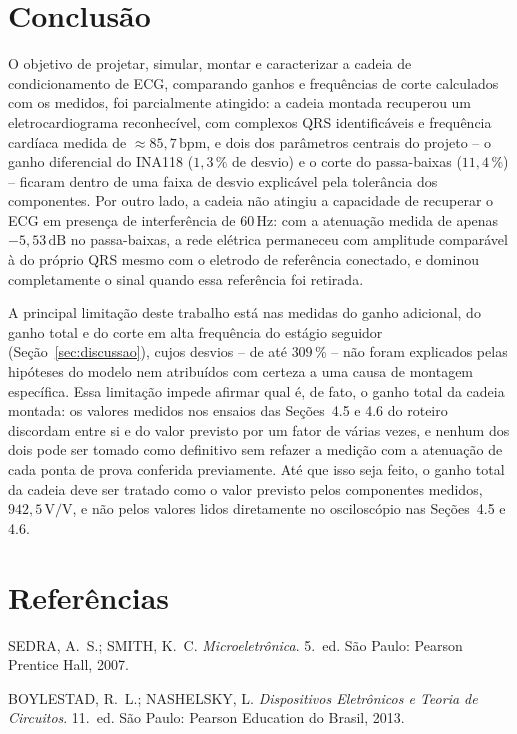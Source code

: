 \documentclass[11pt,a4paper]{article}
\begin{document}
\section{Conclusão}

O objetivo de projetar, simular, montar e caracterizar a cadeia de condicionamento de ECG, comparando ganhos e frequências de corte calculados com os medidos, foi parcialmente atingido: a cadeia montada recuperou um eletrocardiograma reconhecível, com complexos QRS identificáveis e frequência cardíaca medida de \(\approx85{,}7\,\text{bpm}\), e dois dos parâmetros centrais do projeto -- o ganho diferencial do INA118 (\(1{,}3\,\%\) de desvio) e o corte do passa-baixas (\(11{,}4\,\%\)) -- ficaram dentro de uma faixa de desvio explicável pela tolerância dos componentes. Por outro lado, a cadeia não atingiu a capacidade de recuperar o ECG em presença de interferência de \(60\,\text{Hz}\): com a atenuação medida de apenas \(-5{,}53\,\text{dB}\) no passa-baixas, a rede elétrica permaneceu com amplitude comparável à do próprio QRS mesmo com o eletrodo de referência conectado, e dominou completamente o sinal quando essa referência foi retirada.

A principal limitação deste trabalho está nas medidas do ganho adicional, do ganho total e do corte em alta frequência do estágio seguidor (Seção~\ref{sec:discussao}), cujos desvios -- de até \(309\,\%\) -- não foram explicados pelas hipóteses do modelo nem atribuídos com certeza a uma causa de montagem específica. Essa limitação impede afirmar qual é, de fato, o ganho total da cadeia montada: os valores medidos nos ensaios das Seções~4.5 e 4.6 do roteiro discordam entre si e do valor previsto por um fator de várias vezes, e nenhum dos dois pode ser tomado como definitivo sem refazer a medição com a atenuação de cada ponta de prova conferida previamente. Até que isso seja feito, o ganho total da cadeia deve ser tratado como o valor previsto pelos componentes medidos, \(942{,}5\,\text{V/V}\), e não pelos valores lidos diretamente no osciloscópio nas Seções~4.5 e 4.6.

\section{Referências}

\begin{referencias}
\item SEDRA, A.~S.; SMITH, K.~C. \emph{Microeletrônica}. 5.~ed. São Paulo: Pearson
      Prentice Hall, 2007.
\item BOYLESTAD, R.~L.; NASHELSKY, L. \emph{Dispositivos Eletrônicos e Teoria de
      Circuitos}. 11.~ed. São Paulo: Pearson Education do Brasil, 2013.
\end{referencias}
\end{document}

